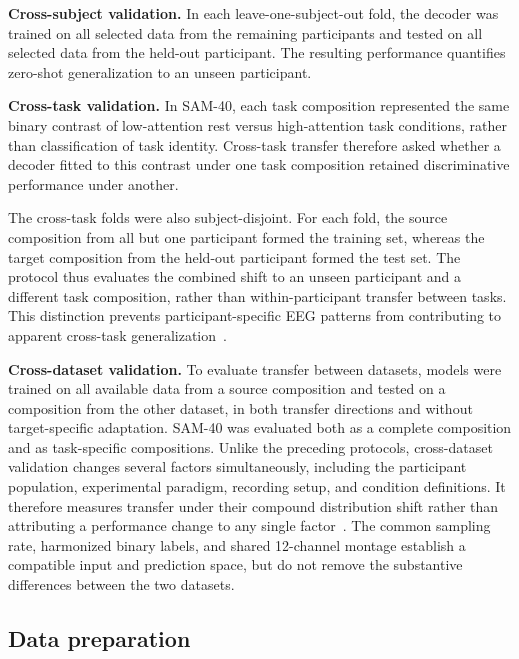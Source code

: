 \documentclass[10pt,letterpaper]{article}
\newcommand{\rev}[1]{#1}
\begin{document}
\textbf{Cross-subject validation.}
\rev{In each leave-one-subject-out fold, the decoder was trained on all selected data from the remaining participants and tested on all selected data from the held-out participant. The resulting performance quantifies zero-shot generalization to an unseen participant.}

\textbf{Cross-task validation.}
\rev{In SAM-40, each task composition represented the same binary contrast of low-attention rest versus high-attention task conditions, rather than classification of task identity. Cross-task transfer therefore asked whether a decoder fitted to this contrast under one task composition retained discriminative performance under another.}

\rev{The cross-task folds were also subject-disjoint. For each fold, the source composition from all but one participant formed the training set, whereas the target composition from the held-out participant formed the test set. The protocol thus evaluates the combined shift to an unseen participant and a different task composition, rather than within-participant transfer between tasks. This distinction prevents participant-specific EEG patterns from contributing to apparent cross-task generalization~\cite{kamrud2021vigilance,ke2021crosstask}.}

\textbf{Cross-dataset validation.}
\rev{To evaluate transfer between datasets, models were trained on all available data from a source composition and tested on a composition from the other dataset, in both transfer directions and without target-specific adaptation. SAM-40 was evaluated both as a complete composition and as task-specific compositions. Unlike the preceding protocols, cross-dataset validation changes several factors simultaneously, including the participant population, experimental paradigm, recording setup, and condition definitions. It therefore measures transfer under their compound distribution shift rather than attributing a performance change to any single factor~\cite{lan2019domain}. The common sampling rate, harmonized binary labels, and shared 12-channel montage establish a compatible input and prediction space, but do not remove the substantive differences between the two datasets.}

\subsection*{Data preparation}
\end{document}
